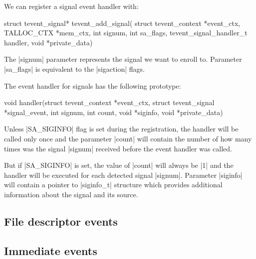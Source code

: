 \noindent
We can register a signal event handler with:

\begin{funcproto}
struct tevent_signal* tevent_add_signal(
             struct tevent_context *event_ctx,
             TALLOC_CTX *mem_ctx,
             int signum, int sa_flags,
             tevent_signal_handler_t handler,
             void *private_data)   
\end{funcproto}
\begin{funcdesc}
The |signum| parameter represents the signal we want to enroll to.
Parameter |sa_flags| is equivalent to the |sigaction| flags.
\end{funcdesc}
\funclistend
The event handler for signals has the following prototype:

\begin{funcproto}
void handler(struct tevent_context *event_ctx,
             struct tevent_signal *signal_event,
             int signum, int count, void *siginfo,
             void *private_data)
\end{funcproto}
\funclistend
Unless |SA_SIGINFO| flag is set during the registration, the handler will be
called only once and the parameter |count| will contain the number of how many
times was the signal |signum| received before the event handler was called.

But if |SA_SIGINFO| is set, the value of |count| will always be |1| and the
handler will be executed for each detected signal |signum|. Parameter |siginfo|
will contain a pointer to |siginfo_t| structure which provides additional
information about the signal and its source.

\subsection{File descriptor events}

\subsection{Immediate events}